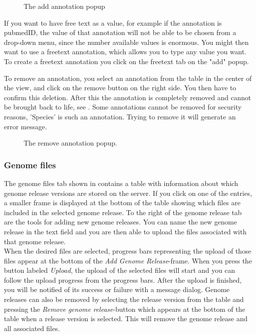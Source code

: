 \begin{figure}[htb]
	\caption{The add annotation popup}
	\label{fig:adm_addAnnotationPopup}
\end{figure}

If you want to have free text as a value, for example if the annotation is pubmedID, the value of that annotation will not be able to be chosen from a drop-down menu, since the number available values is enormous. You might then want to use a freetext annotation, which allows you to type any value you want. To create a freetext annotation you click on the freetext tab on the "add" popup. 


To remove an annotation, you select an annotation from the table in the center of the view, and click on the remove button on the right side. You then have to confirm this deletion. After this the annotation is completely removed and cannot be brought back to life, see . Some annotations cannot be removed for security reasons, 'Species' is such an annotation. Trying to remove it will generate an error message.
\begin{figure}[h!]
\caption{The remove annotation popup.}
\label{fig:adm_desktopRemoveAnnotation}
\end{figure}
\subsubsection{Genome files}


The genome files tab shown in  contains a table with information about which genome release versions are stored on the server. If you click on one of the entries, a smaller frame is displayed at the bottom of the table showing which files are included in the selected genome release. To the right of the genome release tab are the tools for adding new genome releases. You can name the new genome release in the text field and you are then able to upload the files associated with that genome release. \\

When the desired files are selected, progress bars representing the upload of those files appear at the bottom of the \textit{Add Genome Release}-frame. When you press the button labeled \textit{Upload}, the upload of the selected files will start and you can follow the upload progress from the progress bars. After the upload is finished, you will be notified of its success or failure with a message dialog.
Genome releases can also be removed by selecting the release version from the table and pressing the \textit{Remove genome release}-button which appears at the bottom of the table when a release version is selected. This will remove the genome release and all associated files.

